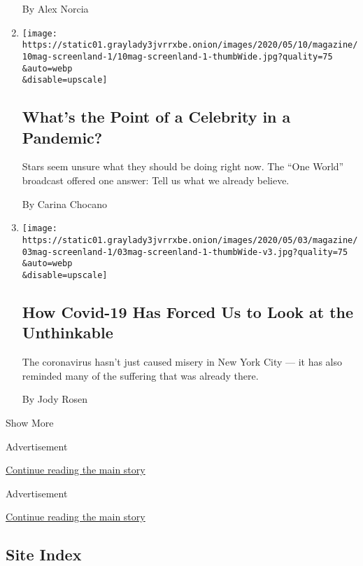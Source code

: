 \begin{enumerate}
  By Alex Norcia
\item
  \href{/2020/05/06/magazine/whats-the-point-of-a-celebrity-in-a-pandemic.html}{}

  \texttt{[image: https://static01.graylady3jvrrxbe.onion/images/2020/05/10/magazine/10mag-screenland-1/10mag-screenland-1-thumbWide.jpg?quality=75\\\&auto=webp\\\&disable=upscale]}

  \hypertarget{whats-the-point-of-a-celebrity-in-a-pandemic}{%
  \subsection{What's the Point of a Celebrity in a
  Pandemic?}\label{whats-the-point-of-a-celebrity-in-a-pandemic}}

  Stars seem unsure what they should be doing right now. The ``One
  World'' broadcast offered one answer: Tell us what we already believe.

  By Carina Chocano
\item
  \href{/2020/04/29/magazine/covid-hart-island.html}{}

  \texttt{[image: https://static01.graylady3jvrrxbe.onion/images/2020/05/03/magazine/03mag-screenland-1/03mag-screenland-1-thumbWide-v3.jpg?quality=75\\\&auto=webp\\\&disable=upscale]}

  \hypertarget{how-covid-19-has-forced-us-to-look-at-the-unthinkable}{%
  \subsection{How Covid-19 Has Forced Us to Look at the
  Unthinkable}\label{how-covid-19-has-forced-us-to-look-at-the-unthinkable}}

  The coronavirus hasn't just caused misery in New York City --- it has
  also reminded many of the suffering that was already there.

  By Jody Rosen
\end{enumerate}

Show More

Advertisement

\protect\hyperlink{after-mid1}{Continue reading the main story}

Advertisement

\protect\hyperlink{after-mktg}{Continue reading the main story}

\hypertarget{site-index}{%
\subsection{Site Index}\label{site-index}}

